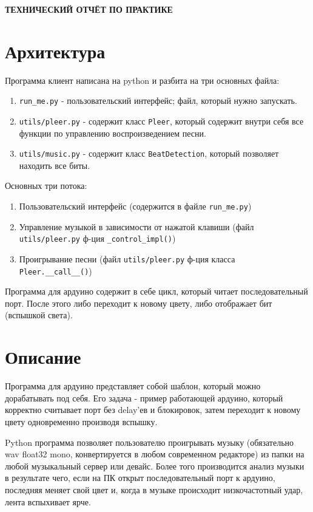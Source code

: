 \begin{center}
\bfseries{\large ТЕХНИЧЕСКИЙ ОТЧЁТ ПО ПРАКТИКЕ}
\end{center}

\section*{Архитектура}
Программа клиент написана на python и разбита на три основных файла:

\begin{enumerate}
    \item \verb|run_me.py| - пользовательский интерфейс; файл, который нужно запускать.
    \item \verb|utils/pleer.py| - содержит класс \verb|Pleer|, который содержит внутри себя все функции по управлению воспроизведением песни.
    \item \verb|utils/music.py| - содержит класс \verb|BeatDetection|, который позволяет находить все биты.
\end{enumerate}

Основных три потока:

\begin{enumerate}
    \item Пользовательский интерфейс (содержится в файле \verb|run_me.py|)
    \item Управление музыкой в зависимости от нажатой клавиши
        (файл \verb|utils/pleer.py| ф-ция \verb|_control_impl()|)
    \item Проигрывание песни (файл \verb|utils/pleer.py| ф-ция класса \verb|Pleer.__call__()|)
\end{enumerate}


Программа для ардуино содержит в себе цикл, который читает последовательный порт. После этого либо переходит к новому цвету, либо отображает бит (вспышкой света).

\section*{Описание}

Программа для ардуино представляет собой шаблон, который можно дорабатывать под себя. Его задача - пример работающей ардуино, который корректно считывает порт без delay'ев и блокировок, затем переходит к новому цвету одновременно производя вспышку.

Python программа позволяет пользователю проигрывать музыку (обязательно wav float32 mono, конвертируется в любом современном редакторе) из папки на любой музыкальный сервер или девайс. Более того производится анализ музыки в результате чего, если на ПК открыт последовательный порт к ардуино, последняя меняет свой цвет и, когда в музыке происходит низкочастотный удар, лента вспыхивает ярче.

